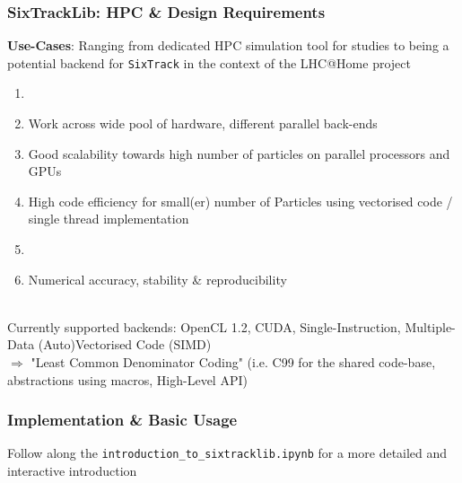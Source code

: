 \documentclass{beamer}
\begin{document}
\begin{frame}[fragile]
    \frametitle{SixTrackLib: HPC \& Design Requirements}
    \textbf{Use-Cases}: Ranging from dedicated HPC simulation tool for studies to being a potential backend for \texttt{SixTrack} in the context of the LHC@Home project\\[0.2cm]
    \begin{enumerate}
                \item {}
                      {}
                \item<2-> Work across wide pool of hardware, different parallel back-ends 
                \item<3-> Good scalability towards high number of particles on parallel processors and GPUs
                \item<4-> High code efficiency for small(er) number of Particles using vectorised code / single thread implementation
                \item<5->{}
                         {}
                \item<6->Numerical accuracy, stability \& reproducibility
        \end{enumerate}
    \\[0.3cm]
    {
    Currently supported backends: OpenCL 1.2, CUDA, Single-Instruction, Multiple-Data (Auto)Vectorised Code (SIMD)
    \\[0.3cm] $\Rightarrow$ "Least Common Denominator Coding" (i.e. C99 for the shared code-base, abstractions using macros, High-Level API)
    }
\end{frame}

%



\begin{frame}[label=beginintro1]
\frametitle{Implementation \& Basic Usage}
\begin{center}
    \Large{ Follow along the \texttt{introduction\_to\_sixtracklib.ipynb} for a more detailed and interactive introduction}
    \\[2em]
    \hyperlink{endintro1}{}
\end{center}
\end{frame}
\end{document}
